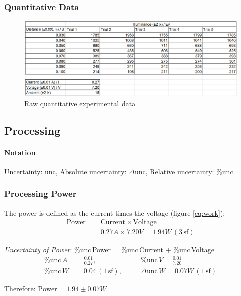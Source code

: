 \documentclass[a4paper,12pt]{article}
\newcommand{\absun}{\Delta \text{unc}\,}
\newcommand{\relun}{\% \text{unc}\,}
\newcommand{\tsf}{\,\text{sf}}
\begin{document}
\subsubsection*{Quantitative Data}
\begin{figure}[H]
    \centering
    \includegraphics[width=\textwidth]{assets/rawdata.png}
    \caption{Raw quantitative experimental data}
    \label{fig:raw}
\end{figure}

\subsection{Processing}
\paragraph{Notation}

Uncertainty: unc, Absolute uncertainty: $\Delta$unc, Relative uncertainty: \%unc


\subsubsection{Processing Power}
The power is defined as the current times the voltage (figure \ref{eq:work}):
\begin{align*}
\text{Power} &= \text{Current} \times \text{Voltage}\\
        &= 0.27\si{A} \times 7.20\si{V} = 1.94 \si{W} \,(3 \tsf)
\end{align*}

\textit{Uncertainty of Power}: $\relun$Power =  $\relun$Current +  $\relun$Voltage
\begin{alignat*}
    \relun \si{A} &= \frac{0.01}{0.27},\quad &&\relun \si{V} = \frac{0.01}{7.20}\\
    \relun \si{W} &= 0.04 \,(1 \tsf), \quad &&\absun \si{W} = 0.07\si{W} \,(1 \tsf)
\end{alignat*}

Therefore: $\text{Power} = 1.94 \pm 0.07 \si{W}$
\end{document}

